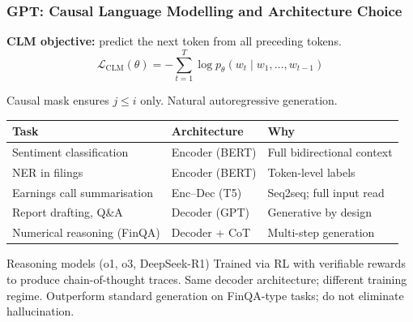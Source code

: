 \documentclass[9pt,t]{beamer}
\begin{document}
\begin{frame}
\frametitle{GPT: Causal Language Modelling and Architecture Choice}

\textbf{CLM objective:} predict the next token from all preceding tokens.
\[
\mathcal{L}_{\text{CLM}}(\theta) = -\sum_{t=1}^{T} \log p_\theta(w_t \mid w_1,\ldots,w_{t-1})
\]

Causal mask ensures $j \leq i$ only. Natural autoregressive generation.

\medskip
\begin{tabular}{lll}
\toprule
\textbf{Task} & \textbf{Architecture} & \textbf{Why} \\
\midrule
Sentiment classification    & Encoder (BERT) & Full bidirectional context \\
NER in filings              & Encoder (BERT) & Token-level labels \\
Earnings call summarisation & Enc--Dec (T5)  & Seq2seq; full input read \\
Report drafting, Q\&A       & Decoder (GPT)  & Generative by design \\
Numerical reasoning (FinQA) & Decoder + CoT  & Multi-step generation \\
\bottomrule
\end{tabular}

\medskip
\begin{alertblock}{Reasoning models (o1, o3, DeepSeek-R1)}
Trained via RL with verifiable rewards to produce chain-of-thought traces.
Same decoder architecture; different training regime. Outperform standard
generation on FinQA-type tasks; do not eliminate hallucination.
\end{alertblock}
\end{frame}
\end{document}
